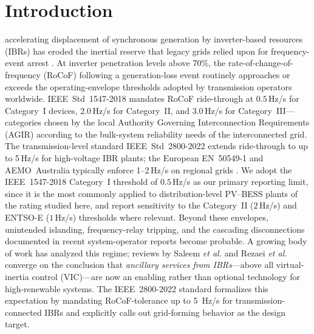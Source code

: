\documentclass[journal]{IEEEtran}
\begin{document}
\section{Introduction}\label{sec:intro}
 accelerating displacement of synchronous
generation by inverter-based resources (IBRs) has eroded the inertial
reserve that legacy grids relied upon for frequency-event arrest
\cite{tielens2016relevance,milano2018foundations}. At inverter
penetration levels above 70\%, the rate-of-change-of-frequency
(RoCoF) following a generation-loss event routinely approaches or
exceeds the operating-envelope thresholds adopted by transmission
operators worldwide. IEEE~Std~1547-2018 \cite{ieee15472018} mandates
RoCoF ride-through at $0.5$\,Hz/s for Category~I devices, $2.0$\,Hz/s
for Category~II, and $3.0$\,Hz/s for Category~III---categories
chosen by the local Authority Governing Interconnection Requirements
(AGIR) according to the bulk-system reliability needs of the
interconnected grid. The transmission-level standard
IEEE~Std~2800-2022 \cite{ieee28002022} extends ride-through to up to
5\,Hz/s for high-voltage IBR plants; the European EN~50549-1
\cite{en505492019} and AEMO~Australia typically enforce 1--2\,Hz/s on
regional grids \cite{paturet2023fast}.
We adopt the IEEE~1547-2018 Category~I threshold of $0.5$\,Hz/s as
our primary reporting limit, since it is the most commonly applied
to distribution-level PV--BESS plants of the rating studied here, and
report sensitivity to the Category~II ($2$\,Hz/s) and ENTSO-E
($1$\,Hz/s) thresholds where relevant. Beyond these envelopes,
unintended islanding, frequency-relay tripping, and the cascading
disconnections documented in recent system-operator reports
\cite{neso2024oscillation} become probable.
A growing body of work has analyzed this regime; reviews by Saleem
\textit{et al.} \cite{saleem2024assessment} and Rezaei \textit{et al.}
\cite{rezaeian2025review} converge on the conclusion that
\emph{ancillary services from IBRs}---above all virtual-inertia
control (VIC)---are now an enabling rather than optional technology
for high-renewable systems. The IEEE~2800-2022 standard
\cite{ieee28002022} formalizes this expectation by mandating
RoCoF-tolerance up to \SI{5}{\Hz/\s} for transmission-connected IBRs
and explicitly calls out grid-forming behavior as the design target.
\end{document}
